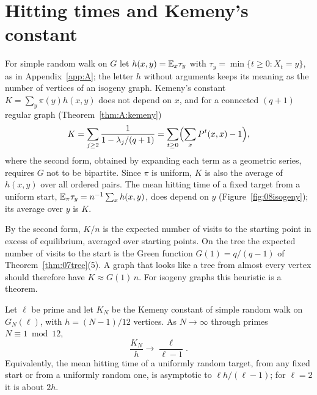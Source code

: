 \section{Hitting times and Kemeny's constant}

For simple random walk on $G$ let $h(x,y)=\mathbb{E}_x\tau_y$ with $\tau_y=\min\{t\ge0:X_t=y\}$, as in Appendix~\ref{app:A}; the letter $h$ without arguments keeps its meaning as the number of vertices of an isogeny graph. Kemeny's constant $K=\sum_y\pi(y)h(x,y)$ does not depend on $x$, and for a connected $(q+1)$ regular graph (Theorem~\ref{thm:A:kemeny})
\[
K=\sum_{j\ge2}\frac{1}{1-\lambda_j/(q+1)}=\sum_{t\ge0}\Bigl(\sum_{x}P^t(x,x)-1\Bigr),
\]
where the second form, obtained by expanding each term as a geometric series, requires $G$ not to be bipartite. Since $\pi$ is uniform, $K$ is also the average of $h(x,y)$ over all ordered pairs. The mean hitting time of a fixed target from a uniform start, $\mathbb{E}_\pi\tau_y=n^{-1}\sum_xh(x,y)$, does depend on $y$ (Figure~\ref{fig:08isogeny}); its average over $y$ is $K$.

By the second form, $K/n$ is the expected number of visits to the starting point in excess of equilibrium, averaged over starting points. On the tree the expected number of visits to the start is the Green function $G(1)=q/(q-1)$ of Theorem~\ref{thm:07tree}(5). A graph that looks like a tree from almost every vertex should therefore have $K\approx G(1)\,n$. For isogeny graphs this heuristic is a theorem.

\begin{theorem}\label{thm:08kemeny}
Let $\ell$ be prime and let $K_N$ be the Kemeny constant of simple random walk on $G_N(\ell)$, with $h=(N-1)/12$ vertices. As $N\to\infty$ through primes $N\equiv1\bmod12$,
\[
\frac{K_N}{h}\longrightarrow\frac{\ell}{\ell-1}.
\]
Equivalently, the mean hitting time of a uniformly random target, from any fixed start or from a uniformly random one, is asymptotic to $\ell h/(\ell-1)$; for $\ell=2$ it is about $2h$.
\end{theorem}

